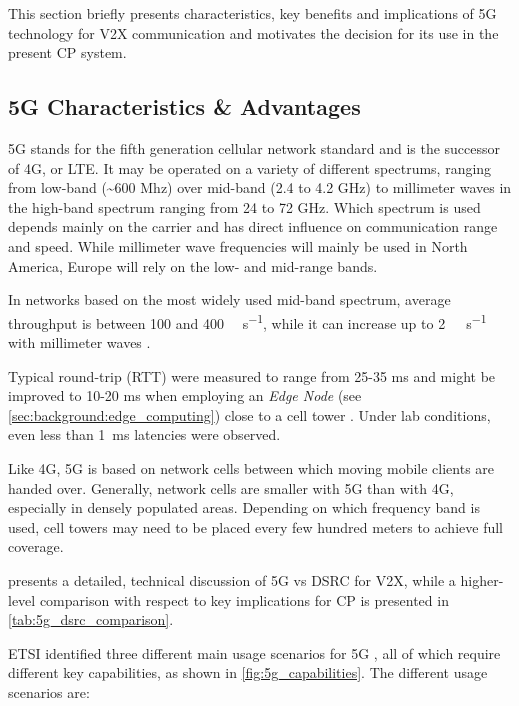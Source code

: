 This section briefly presents characteristics, key benefits and implications of 5G technology for V2X communication and motivates the decision for its use in the present CP system.

\subsection{5G Characteristics \& Advantages}
\label{subsec:concept_design:5g_characteristics_advantages}
5G stands for the fifth generation cellular network standard and is the successor of 4G, or LTE. It may be operated on a variety of different spectrums, ranging from low-band (\textasciitilde 600 Mhz) over mid-band (2.4 to 4.2 \si{\giga\hertz}) to millimeter waves in the high-band spectrum ranging from 24 to 72 \si{\giga\hertz}. Which spectrum is used depends mainly on the carrier and has direct influence on communication range and speed. While millimeter wave frequencies will mainly be used in North America, Europe will rely on the low- and mid-range bands.

In networks based on the most widely used mid-band spectrum, average throughput is between 100 and 400 \si{\mega\bit\per\second}, while it can increase up to \SI{2}{\giga\bit\per\second} with millimeter waves \cite{wiki:5g}.

Typical round-trip (RTT) were measured to range from 25-35 \si{\milli\second} and might be improved to 10-20 \si{\milli\second} when employing an \textit{Edge Node} (see \cref{sec:background:edge_computing}) close to a cell tower \cite{wiki:5g}. Under lab conditions, even less than \SI{1}{\milli\second} latencies were observed.

Like 4G, 5G is based on network cells between which moving mobile clients are handed over. Generally, network cells are smaller with 5G than with 4G, especially in densely populated areas. Depending on which frequency band is used, cell towers may need to be placed every few hundred meters to achieve full coverage.

\cite{5GAutomotiveAssociation2016} presents a detailed, technical discussion of 5G vs DSRC for V2X, while a higher-level comparison with respect to key implications for CP is presented in \cref{tab:5g_dsrc_comparison}.
\par
\bigskip

ETSI identified three different main usage scenarios for 5G \cite{ETSI5G}, all of which require different key capabilities, as shown in \cref{fig:5g_capabilities}. The different usage scenarios are:

